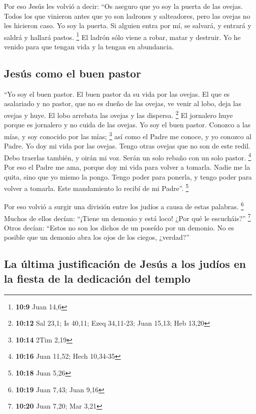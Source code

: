  Por eso Jesús les volvió a decir: ``Os aseguro que yo soy
la puerta de las ovejas.  Todos los que vinieron antes que
yo son ladrones y salteadores, pero las ovejas no les hicieron caso.
 Yo soy la puerta. Si alguien entra por mí, se salvará, y
entrará y saldrá y hallará pastos. \footnote{\textbf{10:9} Juan 14,6}
 El ladrón sólo viene a robar, matar y destruir. Yo he
venido para que tengan vida y la tengan en abundancia.

\hypertarget{jesuxfas-como-el-buen-pastor}{%
\subsection{Jesús como el buen
pastor}\label{jesuxfas-como-el-buen-pastor}}

 ``Yo soy el buen pastor. El buen pastor da su vida por
las ovejas.  El que es asalariado y no pastor, que no es
dueño de las ovejas, ve venir al lobo, deja las ovejas y huye. El lobo
arrebata las ovejas y las dispersa. \footnote{\textbf{10:12} Sal 23,1;
  Is 40,11; Ezeq 34,11-23; Juan 15,13; Heb 13,20}  El
jornalero huye porque es jornalero y no cuida de las ovejas.
 Yo soy el buen pastor. Conozco a las mías, y soy
conocido por las mías; \footnote{\textbf{10:14} 2Tim 2,19}
 así como el Padre me conoce, y yo conozco al Padre. Yo
doy mi vida por las ovejas.  Tengo otras ovejas que no
son de este redil. Debo traerlas también, y oirán mi voz. Serán un solo
rebaño con un solo pastor. \footnote{\textbf{10:16} Juan 11,52; Hech
  10,34-35}  Por eso el Padre me ama, porque doy mi vida
para volver a tomarla.  Nadie me la quita, sino que yo
mismo la pongo. Tengo poder para ponerla, y tengo poder para volver a
tomarla. Este mandamiento lo recibí de mi Padre''. \footnote{\textbf{10:18}
  Juan 5,26}

 Por eso volvió a surgir una división entre los judíos a
causa de estas palabras. \footnote{\textbf{10:19} Juan 7,43; Juan 9,16}
 Muchos de ellos decían: ``¡Tiene un demonio y está loco!
¿Por qué le escucháis?'' \footnote{\textbf{10:20} Juan 7,20; Mar 3,21}
 Otros decían: ``Estos no son los dichos de un poseído
por un demonio. No es posible que un demonio abra los ojos de los
ciegos, ¿verdad?''

\hypertarget{la-uxfaltima-justificaciuxf3n-de-jesuxfas-a-los-juduxedos-en-la-fiesta-de-la-dedicaciuxf3n-del-templo}{%
\subsection{La última justificación de Jesús a los judíos en la fiesta
de la dedicación del
templo}\label{la-uxfaltima-justificaciuxf3n-de-jesuxfas-a-los-juduxedos-en-la-fiesta-de-la-dedicaciuxf3n-del-templo}}

